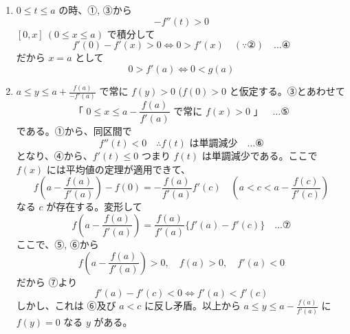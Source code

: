 \documentclass[../main.tex]{subfiles}
\begin{document}
\begin{enumerate}
  \item[(i)] $0 \le t \le a$ の時、①, ③から
    \[
      -f''(t) > 0
    \]
    $[0, x]\ (0 \le x \le a)$ で積分して
    \[
      f'(0) - f'(x) > 0 \iff 0 > f'(x) \quad (\because \text{②}) \quad \dots \text{④}
    \]
    だから $x = a$ として
    \[
      0 > f'(a) \iff 0 < g(a)
    \]

  \item[(ii)] $a \le y \le a + \frac{f(a)}{-f'(a)}$ で常に $f(y) > 0$ ($f(0) > 0$ と仮定する。③とあわせて
      \[
        \text{「 } 0 \le x \le a - \frac{f(a)}{f'(a)} \text{ で常に } f(x) > 0 \text{ 」} \quad \dots \text{⑤}
      \]
      である。①から、同区間で
      \[
        f''(t) < 0 \quad \therefore f(t) \text{ は単調減少} \quad \dots \text{⑥}
      \]
      となり、④から、$f'(t) \le 0$ つまり $f(t)$ は単調減少である。ここで $f(x)$ には平均値の定理が適用できて、
      \[
        f\left(a - \frac{f(a)}{f'(a)}\right) - f(0) = -\frac{f(a)}{f'(a)} f'(c) \quad \left(a < c < a - \frac{f(c)}{f'(c)}\right)
      \]
      なる $c$ が存在する。変形して
      \[
        f\left(a - \frac{f(a)}{f'(a)}\right) = \frac{f(a)}{f'(a)} \{ f'(a) - f'(c) \} \quad \dots \text{⑦}
      \]
      ここで、⑤, ⑥から
      \[
        f\left(a - \frac{f(a)}{f'(a)}\right) > 0, \quad f(a) > 0, \quad f'(a) < 0
      \]
      だから ⑦より
      \[
        f'(a) - f'(c) < 0 \iff f'(a) < f'(c)
      \]
      しかし、これは ⑥及び $a < c$ に反し矛盾。以上から $a \le y \le a - \frac{f(a)}{f'(a)}$ に $f(y) = 0$ なる $y$ がある。
  \end{enumerate}

  
\end{document}

